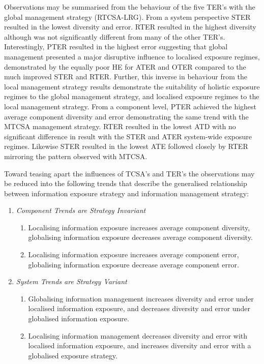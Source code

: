 Observations may be summarised from the behaviour of the five TER's with the global management strategy (RTCSA-LRG). 
From a system perspective STER resulted in the lowest diversity and error. RTER resulted in the highest diversity although was not significantly different from many of the other TER's. Interestingly, PTER resulted in the highest error suggesting that global management presented a major disruptive influence to localised exposure regimes, demonstrated by the equally poor HE for ATER and OTER compared to the much improved STER and RTER. Further, this inverse in behaviour from the local management strategy results demonstrate the suitability of holistic exposure regimes to the global management strategy, and localised exposure regimes to the local management strategy.
From a component level, PTER achieved the highest average component diversity and error demonstrating the same trend with the MTCSA management strategy. RTER resulted in the lowest ATD with no significant difference in result with the STER and ATER system-wide exposure regimes. Likewise STER resulted in the lowest ATE followed closely by RTER mirroring the pattern observed with MTCSA.

Toward teasing apart the influences of TCSA's and TER's the observations may be reduced into the following trends that describe the generalised relationship between information exposure strategy and information management strategy:

\begin{enumerate}
	\item \emph{Component Trends are Strategy Invariant}
	\begin{enumerate}
		\item Localising information exposure increases average component diversity, globalising information exposure decreases average component diversity.
		\item Localising information exposure increases average component error, globalising information exposure decrease average component error.
	\end{enumerate}
	\item \emph{System Trends are Strategy Variant}
	\begin{enumerate}
		\item Globalising information management increases diversity and error under localised information exposure, and decreases diversity and error under globalised information exposure.
		\item Localising information management decreases diversity and error with localised information exposure, and increases diversity and error with a globalised exposure strategy.
	\end{enumerate}
\end{enumerate}

